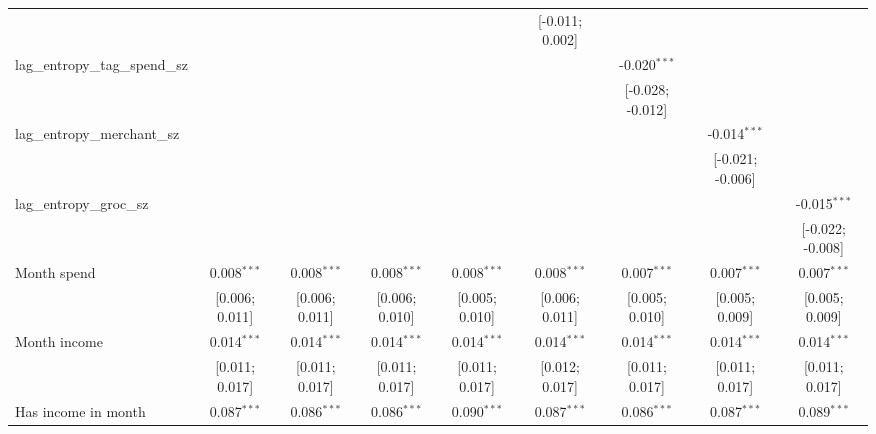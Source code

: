 \begin{table}[htbp]
\begin{threeparttable}[b]
\begin{tabular}{lcccccccc}
                                          &                &                &                &                 & [-0.011; 0.002] &                  &                  &   \\   
         lag\_entropy\_tag\_spend\_sz     &                &                &                &                 &                 & -0.020$^{***}$   &                  &   \\   
                                          &                &                &                &                 &                 & [-0.028; -0.012] &                  &   \\   
         lag\_entropy\_merchant\_sz       &                &                &                &                 &                 &                  & -0.014$^{***}$   &   \\   
                                          &                &                &                &                 &                 &                  & [-0.021; -0.006] &   \\   
         lag\_entropy\_groc\_sz           &                &                &                &                 &                 &                  &                  & -0.015$^{***}$\\   
                                          &                &                &                &                 &                 &                  &                  & [-0.022; -0.008]\\   
         Month spend                      & 0.008$^{***}$  & 0.008$^{***}$  & 0.008$^{***}$  & 0.008$^{***}$   & 0.008$^{***}$   & 0.007$^{***}$    & 0.007$^{***}$    & 0.007$^{***}$\\   
                                          & [0.006; 0.011] & [0.006; 0.011] & [0.006; 0.010] & [0.005; 0.010]  & [0.006; 0.011]  & [0.005; 0.010]   & [0.005; 0.009]   & [0.005; 0.009]\\   
         Month income                     & 0.014$^{***}$  & 0.014$^{***}$  & 0.014$^{***}$  & 0.014$^{***}$   & 0.014$^{***}$   & 0.014$^{***}$    & 0.014$^{***}$    & 0.014$^{***}$\\   
                                          & [0.011; 0.017] & [0.011; 0.017] & [0.011; 0.017] & [0.011; 0.017]  & [0.012; 0.017]  & [0.011; 0.017]   & [0.011; 0.017]   & [0.011; 0.017]\\   
         Has income in month              & 0.087$^{***}$  & 0.086$^{***}$  & 0.086$^{***}$  & 0.090$^{***}$   & 0.087$^{***}$   & 0.086$^{***}$    & 0.087$^{***}$    & 0.089$^{***}$\\   

\end{tabular}
\end{threeparttable}
\end{table}
